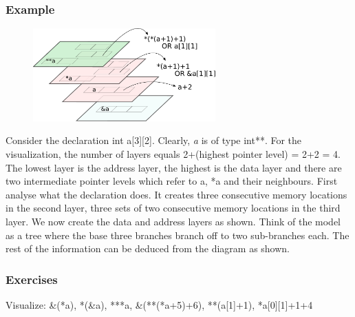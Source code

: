 \documentclass[10pt,twoside]{article}
\begin{document}
\subsubsection*{Example}

\begin{figure}
\includegraphics[width=70mm]{res/dual-ar.pdf}
\end{figure}

Consider the declaration int a[3][2]. Clearly, \textit{a }\textup{is of type
int**. For the visualization, the number of layers equals 2+(highest pointer
level) = 2+2 = 4. The lowest layer is the address layer, the highest is the data
layer and there are two intermediate pointer levels which refer to a, *a and
their neighbours.  First analyse what the declaration does. It creates three
consecutive memory locations in the second layer, three sets of two consecutive
memory locations in the third layer. We now create the data and address layers
as shown. Think of the model as a tree where the base three branches branch off
to two sub-branches each. The rest of the information can be deduced from the
diagram as shown.}

\subsubsection*{Exercises}
Visualize: \&(*a), *(\&a), ***a, \&(**(*a+5)+6), **(a[1]+1),
*a[0][1]+1+4
\newpage
\end{document}
